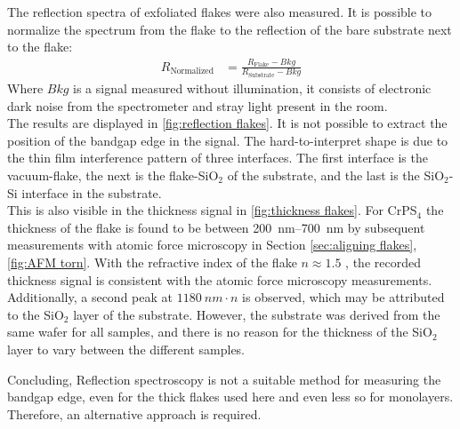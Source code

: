 \documentclass[
	twoside,
	parskip=half,
	a4paper,
]{scrbook}
\begin{document}
The reflection spectra of exfoliated flakes were also measured.
It is possible to normalize the spectrum from the flake to the reflection of the bare substrate next to the flake:
\begin{align}
	R_\text{Normalized} &= \frac{R_\text{Flake} - Bkg}{R_\text{Substrate} - Bkg}
\end{align}
Where $Bkg$ is a signal measured without illumination, it consists of electronic dark noise from the spectrometer and stray light present in the room.\\
The results are displayed in \autoref{fig:reflection flakes}.
It is not possible to extract the position of the bandgap edge in the signal.
The hard-to-interpret shape is due to the thin film interference pattern of three interfaces.
The first interface is the vacuum-flake, the next is the flake-SiO$_2$ of the substrate, and the last is the SiO$_2$-Si interface in the substrate.\\
This is also visible in the thickness signal in \autoref{fig:thickness flakes}.
For CrPS$_4$ the thickness of the flake is found to be between \SIrange{200}{700}{nm} by subsequent measurements with atomic force microscopy in Section \ref{sec:aligning flakes}, \autoref{fig:AFM torn}.
With the refractive index of the flake $n\approx1.5$ \cite{CrPS4_refrative}, the recorded thickness signal is consistent with the atomic force microscopy measurements.
Additionally, a second peak at $\SI{1180}{nm}\cdot n$ is observed, which may be attributed to the SiO$_2$ layer of the substrate. 
However, the substrate was derived from the same wafer for all samples, and there is no reason for the thickness of the SiO$_2$ layer to vary between the different samples.

Concluding, Reflection spectroscopy is not a suitable method for measuring the bandgap edge, even for the thick flakes used here and even less so for monolayers. 
Therefore, an alternative approach is required.
\end{document}
